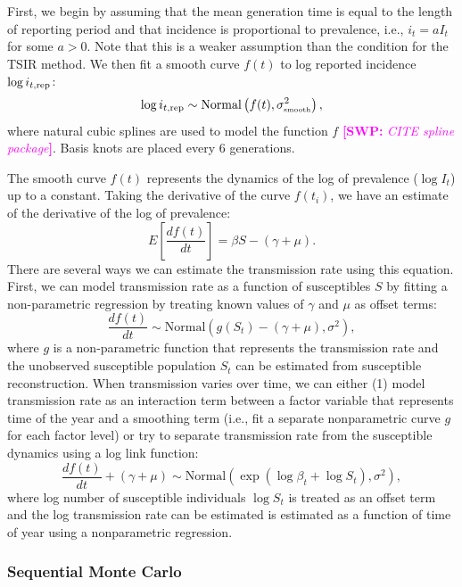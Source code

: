 \documentclass{article}
\newcommand{\comment}[3]{\textcolor{#1}{\textbf{[#2: }\textsl{#3}\textbf{]}}}
\newcommand{\swp}[1]{\comment{magenta}{SWP}{#1}}
\newcommand{\tsub}[2]{#1_{{\textrm{\tiny #2}}}}
\begin{document}
First, we begin by assuming that the mean generation time is equal to the length of reporting period and that incidence is proportional to prevalence, i.e., $i_t = a I_t$ for some $a > 0$. 
Note that this is a weaker assumption than the condition for the TSIR method.
We then fit a smooth curve $f(t)$ to log reported incidence $\log i_{t, {\tiny \textrm{rep}}}$:
\begin{equation}
\log i_{t, {\tiny \textrm{rep}}} \sim \mathrm{Normal}\left(f(t), \tsub{\sigma}{smooth}^2 \right),
\end{equation}
where natural cubic splines are used to model the function $f$ \swp{CITE spline package}.
Basis knots are placed every 6 generations.

The smooth curve $f(t)$ represents the dynamics of the log of prevalence ($\log I_t$) up to a constant.
Taking the derivative of the curve $f(t_i)$, we have an estimate of the derivative of the log of prevalence:
\begin{equation}
E\left[\frac{df(t)}{dt}\right] = \beta S - (\gamma + \mu).
\end{equation}
There are several ways we can estimate the transmission rate using this equation.
First, we can model transmission rate as a function of susceptibles $S$ by fitting a non-parametric regression by treating known values of $\gamma$ and $\mu$ as offset terms:
\begin{equation}
\frac{df(t)}{dt} \sim \mathrm{Normal}(g(S_t) - (\gamma + \mu), \sigma^2),
\end{equation}
where $g$ is a non-parametric function that represents the transmission rate and the unobserved susceptible population $S_t$ can be estimated from susceptible reconstruction.
When transmission varies over time, we can either (1) model transmission rate as an interaction term between a factor variable that represents time of the year and a smoothing term (i.e., fit a separate nonparametric curve $g$ for each factor level) or try to separate transmission rate from the susceptible dynamics using a log link function:
\begin{equation}
\frac{d f(t)}{dt} + (\gamma + \mu) \sim \mathrm{Normal}\left(\exp \left(\log \beta_t + \log S_t\right), \sigma^2\right),
\end{equation}
where log number of susceptible individuals $\log S_t$ is treated as an offset term and the log transmission rate can be estimated is estimated as a function of time of year using a nonparametric regression.

\subsubsection*{Sequential Monte Carlo}
\end{document}
